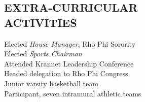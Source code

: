 \documentclass[margin, 10pt]{res} %
\begin{document}
\begin{resume}

    \section{EXTRA-CURRICULAR \\ ACTIVITIES}

    Elected {\it House Manager}, Rho Phi Sorority \\
    Elected {\it Sports Chairman} \\
    Attended Krannet Leadership Conference \\
    Headed delegation to Rho Phi Congress \\
    Junior varsity basketball team \\
    Participant, seven intramural athletic teams


\end{resume}
\end{document}
